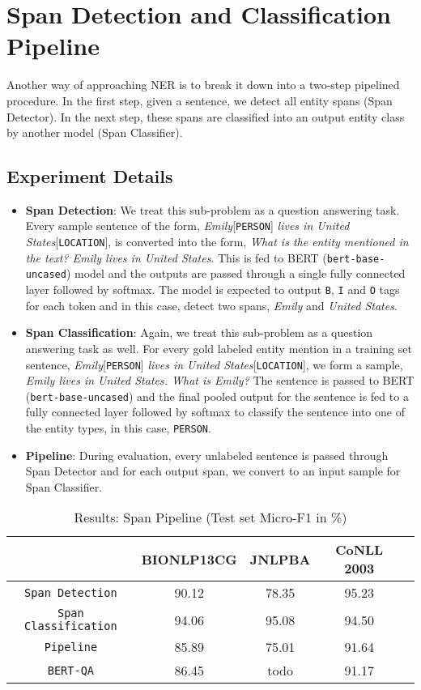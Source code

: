 \section{Span Detection and Classification Pipeline}
Another way of approaching NER is to break it down into a two-step pipelined procedure. In the first step, given a sentence, we detect all entity spans (Span Detector). In the next step, these spans are classified into an output entity class by another model (Span Classifier).

\subsection{Experiment Details}

\begin{itemize}
    \item \textbf{Span Detection}: We treat this sub-problem as a question answering task. Every sample sentence of the form, \textit{Emily}[\texttt{PERSON}] \textit{lives in United States}[\texttt{LOCATION}], is converted into the form, \textit{What is the entity mentioned in the text? Emily lives in United States}. This is fed to BERT (\texttt{bert-base-uncased}) model and the outputs are passed through a single fully connected layer followed by softmax. The model is expected to output \texttt{B}, \texttt{I} and \texttt{O} tags for each token and in this case, detect two spans, \textit{Emily} and \textit{United States}. 
    
    \item \textbf{Span Classification}: Again, we treat this sub-problem as a question answering task as well. For every gold labeled entity mention in a training set sentence, \textit{Emily}[\texttt{PERSON}] \textit{lives in United States}[\texttt{LOCATION}], we form a sample, \textit{Emily lives in United States. What is Emily?} The sentence is passed to BERT (\texttt{bert-base-uncased}) and the final pooled output for the sentence is fed to a fully connected layer followed by softmax to classify the sentence into one of the entity types, in this case, \texttt{PERSON}.
    
    \item \textbf{Pipeline}: During evaluation, every unlabeled sentence is passed through Span Detector and for each output span, we convert to an input sample for Span Classifier.
\end{itemize}

\begin{table}[h!]
\centering
\begin{tabular}{|c|c|c|c|c|}\hline
	\textbf{} & \textbf{BIONLP13CG} & \textbf{JNLPBA} & \textbf{CoNLL 2003}\\\hline
	\texttt{Span Detection} & 90.12 & 78.35 & 95.23\\\hline
	\texttt{Span Classification} & 94.06 & 95.08 & 94.50\\\hline
	\texttt{Pipeline} & 85.89 & 75.01 & 91.64\\\hline
	\texttt{BERT-QA} & 86.45 & todo & 91.17\\\hline
	\end{tabular}
    \caption{Results: Span Pipeline (Test set Micro-F1 in \%)}
    \label{tab:res_span}
\end{table}

